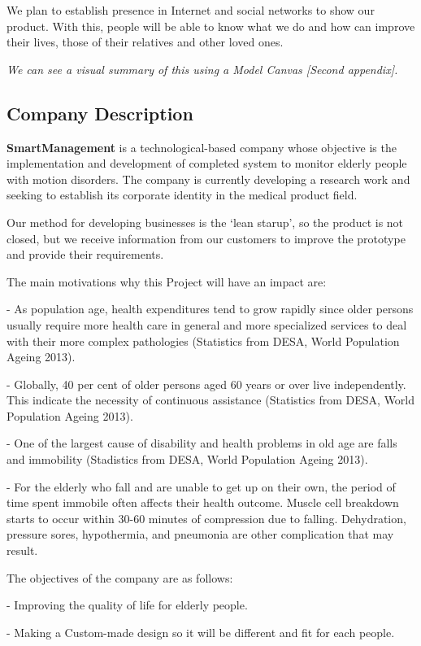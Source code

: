 We plan to establish presence in Internet and social networks to show our product. With this, people will be able to know what we do and how can improve their lives, those of their relatives and other loved ones.

\textit{We can see a visual summary of this using a Model Canvas [Second appendix].}
\vfill
\subsection{Company Description}
\textbf{SmartManagement} is a technological-based company whose objective is the implementation and development of completed system to monitor elderly people with motion disorders. The company is currently developing a research work and seeking to establish its corporate identity in the medical product field.

Our method for developing businesses is the ‘lean starup’, so the product is not closed, but we receive information from our customers to improve the prototype and provide their requirements.

The main motivations why this Project will have an impact are:

-	As population age, health expenditures tend to grow rapidly since older persons usually require more health care in general and more specialized services to deal with their more complex pathologies (Statistics from DESA,  World Population Ageing 2013\cite{desa}).

-	Globally, 40 per cent of older persons aged 60 years or over live independently. This indicate the necessity of continuous assistance (Statistics from DESA,  World Population Ageing 2013\cite{desa}).

-	One of the largest cause of disability and health problems in old age are falls and immobility (Stadistics from DESA,  World Population Ageing 2013\cite{desa}).

-	For the elderly who fall and are unable to get up on their own, the period of time spent immobile often affects their health outcome. Muscle cell breakdown starts to occur within 30-60 minutes of compression due to falling. Dehydration, pressure sores, hypothermia, and pneumonia are other complication that may result\cite{A.Olivares2013}.

The objectives of the company are as follows:

-	Improving the quality of life for elderly people.

-	Making a Custom-made design so it will be different and fit for each people.

